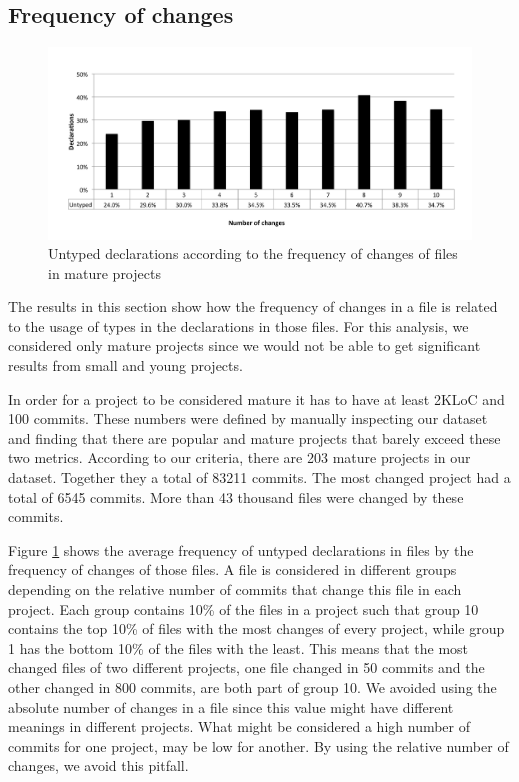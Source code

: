 \documentclass[preprint]{sigplanconf}
\begin{document}

\subsection{Frequency of changes\label{res-changes}}

\begin{figure}[ht]
\centering 
\includegraphics[width=1\textwidth]{change_mean} 
\caption{Untyped declarations according to the frequency of changes of files in mature projects}
\label{fig:change_mean} 
\end{figure}

The results in this section show how the frequency of changes in a file is related to the usage of types in the declarations in those files.
For this analysis, we considered only mature projects since we would not be able to get significant results from small and young projects.

In order for a project to be considered mature it has to have at least 2KLoC and 100 commits.
These numbers were defined by manually inspecting our dataset and finding that there are popular and mature projects that barely exceed these two metrics.
According to our criteria, there are 203 mature projects in our dataset.
Together they a total of 83211 commits. 
The most changed project had a total of 6545 commits.
More than 43 thousand files were changed by these commits.

Figure \ref{fig:change_mean} shows the average frequency of untyped declarations in files by the frequency of changes of those files.
A file is considered in different groups depending on the relative number of commits that change this file in each project.
Each group contains 10\% of the files in a project such that group 10 contains the top 10\% of files with the most changes of every project, while group 1 has the bottom 10\% of the files with the least.
This means that the most changed files of two different projects, one file changed in 50 commits and the other changed in 800 commits, are both part of group 10.
We avoided using the absolute number of changes in a file since this value might have different meanings in different projects.
What might be considered a high number of commits for one project, may be low for another.
By using the relative number of changes, we avoid this pitfall.
\end{document}
